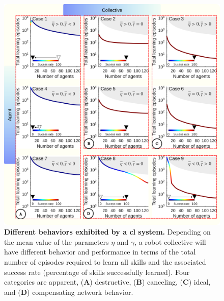 \documentclass[12pt]{article}
\begin{document}
\begin{figure}[t!]
	\centering
	\hspace*{\fill}
	\includegraphics[width=16cm]{collective_learning_cases.png}
	\hspace*{\fill}
	\caption[] {\label{fig:collective_learning_cases} \textbf{Different behaviors exhibited by a \acl{cl} system.} {Depending on the mean value of the parameters $ \eta $ and $ \gamma $, a robot collective will have different behavior and performance in terms of the total number of episodes required to learn all skills and the associated success rate (percentage of skills successfully learned). Four categories are apparent, (\textbf{A}) destructive, (\textbf{B}) canceling, (\textbf{C}) ideal, and (\textbf{D}) compensating network behavior.}}
\end{figure}
\end{document}
